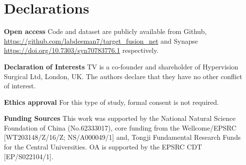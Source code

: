 \documentclass[pdflatex,sn-mathphys-num]{sn-jnl}%
\newcommand{\triplet}[3]{\texttt{$\langle$#1, #2, #3$\rangle$}\xspace}
\theoremstyle{thmstyleone}%
\theoremstyle{thmstyletwo}%
\theoremstyle{thmstylethree}%
\begin{document}








\section*{Declarations}
\noindent\textbf{Open access} Code and dataset are publicly available from Github,
\url{https://github.com/labdeeman7/target_fusion_net} 
and Synapse
\url{https://doi.org/10.7303/syn70783776.1} respectively.

\noindent\textbf{Declaration of Interests} 
TV is a co-founder and shareholder of Hypervision Surgical Ltd, London, UK.
The authors declare that they have no other conflict of interest.

\noindent\textbf{Ethics approval} For this type of study, formal consent is not required.

\noindent\textbf{Funding Sources} This work was supported by the National Natural Science Foundation of China (No.62333017), core funding from the Wellcome/EPSRC [WT203148/Z/16/Z; NS/A000049/1] and, Tongji Fundamental Research Funds for the Central Universities. OA is supported by the EPSRC CDT [EP/S022104/1].

\end{document}
